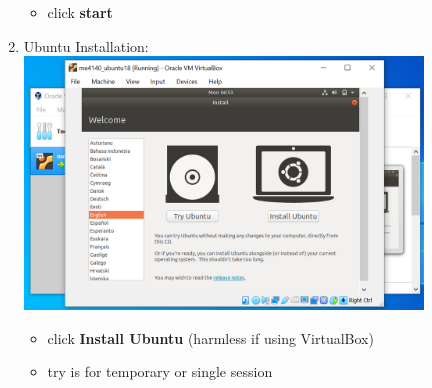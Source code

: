\documentclass[12pt]{article}
\begin{document}
\begin{description}
\begin{description}
\begin{enumerate}
\begin{itemize}
                 \item click {\bf start}

            \end{itemize}

\newpage
\item Ubuntu Installation: \vspace{5mm} \\
      		\hspace*{-2.5cm}\includegraphics[scale=.6]{Capture13.png} 
            \begin{itemize}
               
                 \item click {\bf Install Ubuntu} (harmless if using VirtualBox)
                 \item try is for temporary or single session
                   

\end{itemize}
\end{enumerate}
\end{description}
\end{description}
\end{document}
